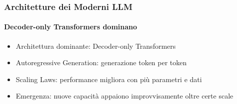 %
\begin{frame}[t,fragile] \frametitle{Architetture dei Moderni LLM}
	{\scriptsize
		\onslide<1->
            \framesubtitle{Decoder-only Transformers dominano}
            \vspace*{-10pt}
	    	\begin{minipage}[t]{\textwidth}
				\begin{minipage}[t]{0.6\textwidth}
	    			\begin{itemize}[leftmargin=10pt,align=right]
						\onslide<2->\item[\alert{\faHandORight}] \alert{Architettura dominante:} Decoder-only Transformers
						\onslide<3->\item[\alert{\faHandORight}] \alert{Autoregressive Generation:} generazione token per token
						\onslide<4->\item[\alert{\faHandORight}] \alert{Scaling Laws:} performance migliora con più parametri e dati
						\onslide<5->\item[\alert{\faHandORight}] \alert{Emergenza:} nuove capacità appaiono improvvisamente oltre certe scale
					\end{itemize}
            	\end{minipage}
            	\begin{minipage}[t]{0.4\textwidth}
            	\end{minipage}
	    	\end{minipage}
	}
\end{frame}
%
